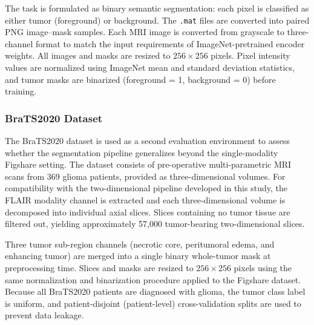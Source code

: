 \documentclass[a4paper,12pt]{article}
\begin{document}
The task is formulated as binary semantic segmentation: each pixel is classified as either tumor
(foreground) or background. The \texttt{.mat} files are converted into paired PNG image--mask
samples. Each MRI image is converted from grayscale to three-channel format to match the input
requirements of ImageNet-pretrained encoder weights. All images and masks are resized to
$256 \times 256$ pixels. Pixel intensity values are normalized using ImageNet mean and standard
deviation statistics, and tumor masks are binarized (foreground = 1, background = 0) before
training.

\subsubsection{BraTS2020 Dataset}
\label{sub:brats2020}

The BraTS2020 dataset \cite{bakas2018identifying} is used as a second evaluation environment to
assess whether the segmentation pipeline generalizes beyond the single-modality Figshare setting.
The dataset consists of pre-operative multi-parametric MRI scans from 369 glioma patients,
provided as three-dimensional volumes. For compatibility with the two-dimensional pipeline
developed in this study, the FLAIR modality channel is extracted and each three-dimensional
volume is decomposed into individual axial slices. Slices containing no tumor tissue are filtered
out, yielding approximately 57,000 tumor-bearing two-dimensional slices.

Three tumor sub-region channels (necrotic core, peritumoral edema, and enhancing tumor) are
merged into a single binary whole-tumor mask at preprocessing time. Slices and masks are
resized to $256 \times 256$ pixels using the same normalization and binarization procedure
applied to the Figshare dataset. Because all BraTS2020 patients are diagnosed with glioma,
the tumor class label is uniform, and patient-disjoint (patient-level) cross-validation splits
are used to prevent data leakage.
\end{document}
